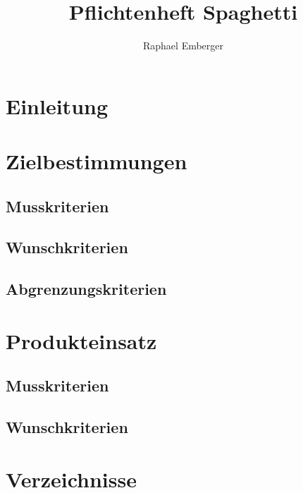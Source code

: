 \documentclass[10pt,a4paper,titlepage,twoside,german]{zhawreprt}
\title{Pflichtenheft Spaghetti}
\author{Raphael Emberger}
\begin{document}
\maketitle
\tableofcontents

\chapter{Einleitung}\label{chp:Introduction}
\chapter{Zielbestimmungen}\label{chp:DefinitionOfGoals}
\section{Musskriterien}\label{sec:MustCriteria}
\section{Wunschkriterien}\label{sec:WishCriteria}
\section{Abgrenzungskriterien}\label{sec:DistinctionCriteria}
\chapter{Produkteinsatz}\label{chp:ProductApplication}
\section{Musskriterien}\label{sec:MustCriteria}
\section{Wunschkriterien}\label{sec:WishCriteria}
\chapter{Verzeichnisse}\label{chp:Index}
\printglossary\label{sec:Glossar}
\newpage
\label{sec:Bibliography}
\end{document}
